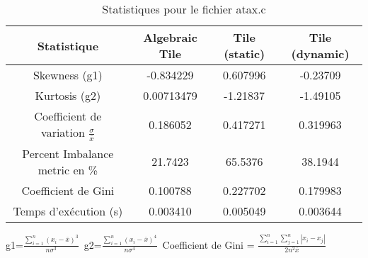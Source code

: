 \documentclass{article}
\begin{document}
\begin{table}[htbp]
  \centering
  \caption{Statistiques pour le fichier atax.c}
  \begin{tabular}{|c|c|c|c|}
    \hline
    Statistique & Algebraic Tile & Tile (static) & Tile (dynamic) \\ 
    \hline
    Skewness (g1)  & -0.834229 & 0.607996 & -0.23709 \\ 
    Kurtosis (g2)  & 0.00713479 & -1.21837 & -1.49105 \\ 
    Coefficient de variation $ \frac{\sigma}{\overline{x}} $ & 0.186052 & 0.417271 & 0.319963\\ 
    Percent Imbalance metric en \% & 21.7423 & 65.5376 & 38.1944\\ 
    Coefficient de Gini  & 0.100788 & 0.227702 & 0.179983\\ 
    Temps d'exécution (s) &  0.003410    &  0.005049   &  0.003644   \\ 

    \hline
  \end{tabular}
\end{table}
g1=$ \frac{\sum_{i=1}^{n} (x_i - \overline{x})^3}{n\sigma^3} $\
g2=$ \frac{\sum_{i=1}^{n} (x_i - \overline{x})^4}{n\sigma^4} $\
Coefficient de Gini = $ \frac{\sum_{i=1}^{n}\sum_{j=1}^{n} |x_i - x_j|}{2n^2\overline{x}} $\
\newpage
\end{document}
